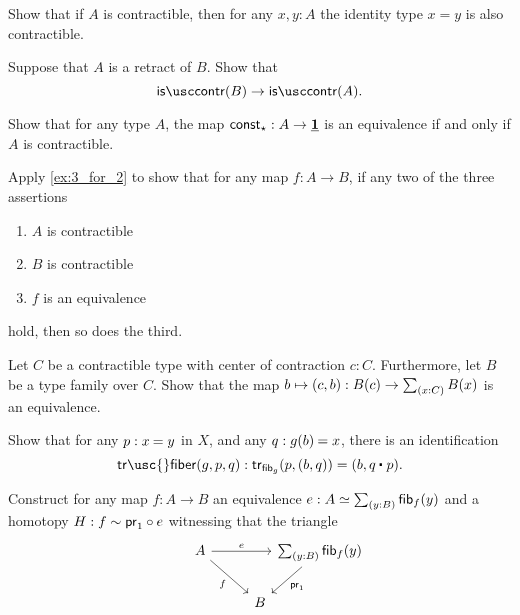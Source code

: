 \begin{exercises}
\item \label{ex:prop_contr}Show that if $A$ is contractible, then for any $x,y:A$ the identity type $x=y$ is also contractible.
\item \label{ex:contr_retr}Suppose that $A$ is a retract of $B$. Show that
\begin{equation*}
\iscontr(B)\to\iscontr(A).
\end{equation*}
\item \label{ex:contr_equiv}
\begin{subexenum}
\item Show that for any type $A$, the map $\mathsf{const}_\star : A\to \underline{\mathbf{1}}$ is an equivalence if and only if $A$ is contractible.
\item Apply \cref{ex:3_for_2} to show that for any map $f:A\to B$, if any two of the three assertions
\begin{enumerate}
\item $A$ is contractible
\item $B$ is contractible
\item $f$ is an equivalence
\end{enumerate}
hold, then so does the third.
\end{subexenum}
\item \label{ex:contr_in_sigma} Let $C$ be a contractible type with center of contraction $c:C$. Furthermore, let $B$ be a type family over $C$. Show that the map $b\mapsto\pairr{c,b}:B(c)\to\sm{x:C}B(x)$ is an equivalence.
\item Show that for any $p:\id{x}{y}$ in $X$, and any $q:\id{g(b)}{x}$, there is an identification
\begin{equation*}
\mathsf{tr\usc{}fiber}(g,p,q) : \mathsf{tr}_{\mathsf{fib}_g}(p,(b,q))=(b,\ct{q}{p}).
\end{equation*}
\item \label{ex:fib_replacement}Construct for any map $f:A\to B$ an equivalence $e:\eqv{A}{\sm{y:B}\fib{f}{y}}$ and a homotopy $H:f\sim \mathsf{pr}_{1}\circ e$ witnessing that the triangle
\begin{equation*}
\begin{tikzcd}[column sep=0em]
A \arrow[rr,"e"] \arrow[dr,swap,"f"] & & \sm{y:B}\fib{f}{y} \arrow[dl,"\proj 1"] \\
\phantom{\sm{y:B}\fib{f}{y}} & B

\end{tikzcd}
\end{equation*}
\end{exercises}
